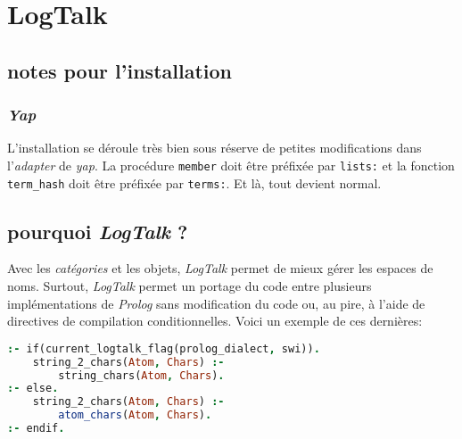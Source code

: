 \documentclass[a4paper,12pt]{book}
\begin{document}
\section{LogTalk}
\subsection{notes pour l'installation}
\subsubsection{\textit{Yap}}

L'installation se déroule très bien sous réserve de petites
modifications dans l'\textit{adapter} de \emph{yap}. 
La procédure \texttt{member} doit être préfixée
par \texttt{lists:} et la fonction \texttt{term\_hash}
doit être préfixée par \texttt{terms:}. 
Et là, tout devient normal.

\subsection{pourquoi \emph{LogTalk} ?}
Avec les \emph{catégories} et les objets, \emph{LogTalk} permet de mieux gérer les espaces de noms. Surtout, \emph{LogTalk} permet un portage du code entre plusieurs implémentations de \emph{Prolog} sans modification du code ou, au pire, à l'aide de directives de compilation conditionnelles. Voici un exemple de ces dernières:

\begin{lstlisting}[language=Prolog, caption=LogTalk compilation conditionnelle]
:- if(current_logtalk_flag(prolog_dialect, swi)).
    string_2_chars(Atom, Chars) :-
        string_chars(Atom, Chars).
:- else.
    string_2_chars(Atom, Chars) :-
        atom_chars(Atom, Chars).
:- endif.
\end{lstlisting}
\end{document}
